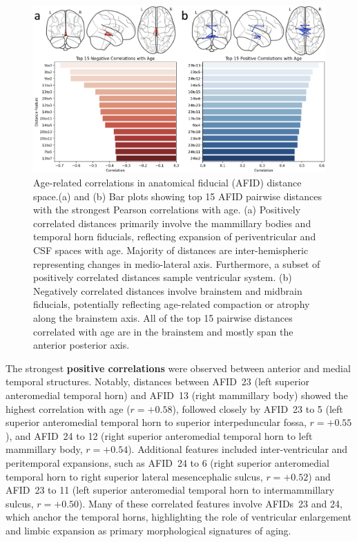 \begin{figure}[hbt!]
    \centering
    \includegraphics[width=1\linewidth]{figs/ch3_Figure_tsne.png}
    \caption{Age-related correlations in anatomical fiducial (AFID) distance space.(a) and (b) Bar plots showing top 15 AFID pairwise distances with the strongest Pearson correlations with age. (a) Positively correlated distances primarily involve the mammillary bodies and temporal horn fiducials, reflecting expansion of periventricular and CSF spaces with age. Majority of distances are inter-hemispheric representing changes in medio-lateral axis. Furthermore, a subset of positively correlated distances sample ventricular system. (b) Negatively correlated distances involve brainstem and midbrain fiducials, potentially reflecting age-related compaction or atrophy along the brainstem axis. All of the top 15 pairwise distances correlated with age are in the brainstem and mostly span the anterior posterior axis. 
    }
    \label{fig:ch3_Figure_tsne}
\end{figure}

The strongest \textbf{positive correlations} were observed between anterior and medial temporal structures. Notably, distances between AFID~23 (left superior anteromedial temporal horn) and AFID~13 (right mammillary body) showed the highest correlation with age ($r = +0.58$), followed closely by AFID~23 to 5 (left superior anteromedial temporal horn to superior interpeduncular fossa, $r = +0.55$), and AFID~24 to 12 (right superior anteromedial temporal horn to left mammillary body, $r = +0.54$). Additional features included inter-ventricular and peritemporal expansions, such as AFID~24 to 6 (right superior anteromedial temporal horn to right superior lateral mesencephalic sulcus, $r = +0.52$) and AFID~23 to 11 (left superior anteromedial temporal horn to intermammillary sulcus, $r = +0.50$). Many of these correlated features involve AFIDs~23 and 24, which anchor the temporal horns, highlighting the role of ventricular enlargement and limbic expansion as primary morphological signatures of aging.

